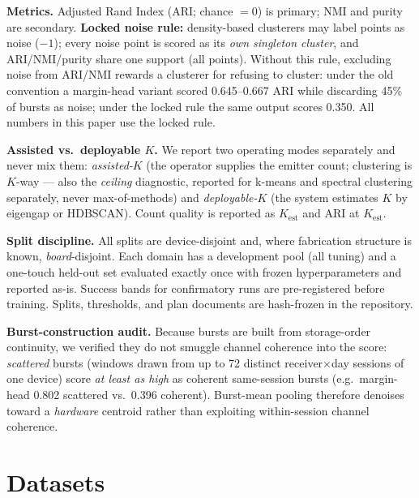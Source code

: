 \documentclass[conference]{IEEEtran}
\begin{document}
\textbf{Metrics.} Adjusted Rand Index (ARI; chance $=0$) is primary; NMI and purity are
secondary. \textbf{Locked noise rule:} density-based clusterers may label points as noise
($-1$); every noise point is scored as its \emph{own singleton cluster}, and ARI/NMI/purity share
one support (all points). Without this rule, excluding noise from ARI/NMI rewards a clusterer for
refusing to cluster: under the old convention a margin-head variant scored 0.645--0.667 ARI while
discarding 45\% of bursts as noise; under the locked rule the same output scores 0.350. All
numbers in this paper use the locked rule.

\textbf{Assisted vs.\ deployable $K$.} We report two operating modes separately and never mix
them: \emph{assisted-$K$} (the operator supplies the emitter count; clustering is $K$-way ---
also the \emph{ceiling} diagnostic, reported for k-means and spectral clustering separately,
never max-of-methods) and \emph{deployable-$K$} (the system estimates $K$ by eigengap or HDBSCAN).
Count quality is reported as $K_{\mathrm{est}}$ and ARI at $K_{\mathrm{est}}$.

\textbf{Split discipline.} All splits are device-disjoint and, where fabrication structure is
known, \emph{board}-disjoint. Each domain has a development pool (all tuning) and a one-touch
held-out set evaluated exactly once with frozen hyperparameters and reported as-is. Success bands
for confirmatory runs are pre-registered before training. Splits, thresholds, and plan documents
are hash-frozen in the repository.

\textbf{Burst-construction audit.} Because bursts are built from storage-order continuity, we
verified they do not smuggle channel coherence into the score: \emph{scattered} bursts (windows
drawn from up to 72 distinct receiver$\times$day sessions of one device) score \emph{at least as
high} as coherent same-session bursts (e.g.\ margin-head 0.802 scattered vs.\ 0.396 coherent).
Burst-mean pooling therefore denoises toward a \emph{hardware} centroid rather than exploiting
within-session channel coherence.

\section{Datasets}
\label{sec:data}
\end{document}
